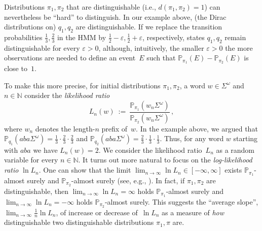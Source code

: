 \documentclass[a4paper,UKenglish,cleveref, autoref,mathscr]{lipics-v2019}
\newcommand{\NN}{\mathbb{N}}
\newcommand{\PP}{\mathbb{P}}
\newcommand{\1}{\mathbbm{1}}
\newcommand{\liexp}{\lim_{n\rightarrow\infty} \frac1n \ln L_n}
\begin{document}
Distributions $\pi_1, \pi_2$ that are distinguishable (i.e., $d(\pi_1,\pi_2) = 1$) can nevertheless be ``hard'' to distinguish.
In our example above, (the Dirac distributions on) $q_1, q_2$ are distinguishable.
If we replace the transition probabilities $\frac13, \frac23$ in the HMM by $\frac12-\varepsilon, \frac12+\varepsilon$, respectively, states $q_1, q_2$ remain distinguishable for every $\varepsilon>0$, although, intuitively, the smaller $\varepsilon > 0$ the more observations are needed to define an event~$E$ such that $\PP_{\pi_1}(E) - \PP_{\pi_2}(E)$ is close to~$1$.

To make this more precise, for initial distributions $\pi_1, \pi_2$, a word $w \in \Sigma^\omega$ and $n \in \NN$ consider the \emph{likelihood ratio}
\[
L_n(w) \ := \ \frac{\PP_{\pi_1}(w_n \Sigma^\omega)}{\PP_{\pi_2}(w_n \Sigma^\omega)}\,,
\]
where $w_n$ denotes the length-$n$ prefix of~$w$.
In the example above, we argued that $\PP_{q_1}(a b a \Sigma^\omega) = \frac13 \cdot \frac23 \cdot \frac23$ and $\PP_{q_2}(a b a \Sigma^\omega) = \frac23 \cdot \frac13 \cdot \frac13$.
Thus, for any word $w$ starting with $a b a$ we have $L_n(w) = 2$. We consider the likelihood ratio~$L_n$ as a random variable for every $n \in \NN$. 
It turns out more natural to focus on the \emph{log-likelihood ratio} $\ln L_n$.
One can show that the limit $\lim_{n \to \infty} \ln L_n \in [-\infty, \infty]$ exists $\PP_{\pi_1}$-almost surely and $\PP_{\pi_2}$-almost surely (see, e.g., \cite[Proposition~6]{kief14}).
In fact, if $\pi_1, \pi_2$ are distinguishable, then $\lim_{n \to \infty} \ln L_n = \infty$ holds $\PP_{\pi_1}$-almost surely and $\lim_{n \to \infty} \ln L_n = -\infty$ holds $\PP_{\pi_2}$-almost surely.
This suggests the ``average slope'', $\liexp$, of increase or decrease of~$\ln L_n$ as a measure of \emph{how} distinguishable two distinguishable distributions $\pi_1,\pi$ are.
\end{document}
